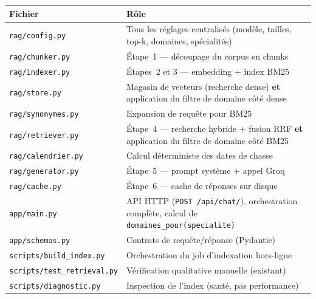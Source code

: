 \documentclass[11pt]{article}
\begin{document}
\begin{tabularx}{\textwidth}{@{}l Y@{}}
\toprule
\textbf{Fichier} & \textbf{Rôle} \\
\midrule
\texttt{rag/config.py} & Tous les réglages centralisés (modèle, tailles, top-k, domaines, spécialités) \\
\texttt{rag/chunker.py} & Étape~1 --- découpage du corpus en chunks \\
\texttt{rag/indexer.py} & Étapes~2 et 3 --- embedding + index BM25 \\
\texttt{rag/store.py} & Magasin de vecteurs (recherche dense) \textbf{et} application du filtre de domaine côté dense \\
\texttt{rag/synonymes.py} & Expansion de requête pour BM25 \\
\texttt{rag/retriever.py} & Étape~4 --- recherche hybride + fusion RRF \textbf{et} application du filtre de domaine côté BM25 \\
\texttt{rag/calendrier.py} & Calcul déterministe des dates de chasse \\
\texttt{rag/generator.py} & Étape~5 --- prompt système + appel Groq \\
\texttt{rag/cache.py} & Étape~6 --- cache de réponses sur disque \\
\texttt{app/main.py} & API HTTP (\texttt{POST /api/chat/}), orchestration complète, calcul de \texttt{domaines\_pour(specialite)} \\
\texttt{app/schemas.py} & Contrats de requête/réponse (Pydantic) \\
\texttt{scripts/build\_index.py} & Orchestration du job d'indexation hors-ligne \\
\texttt{scripts/test\_retrieval.py} & Vérification qualitative manuelle (existant) \\
\texttt{scripts/diagnostic.py} & Inspection de l'index (santé, pas performance) \\
\bottomrule
\end{tabularx}
\end{document}

